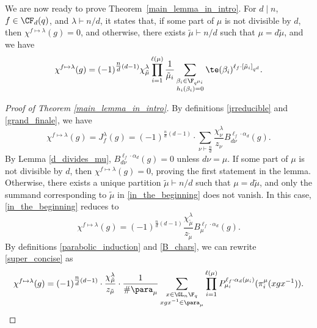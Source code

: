 We are now ready to prove Theorem~\ref{main_lemma_in_intro}.
For \(d \mid n\), \(f \in \CF_d (q)\), and \(\lambda \vdash n/d\), it states that,
if some part of \(\mu\) is not divisible by \(d\), then \(\chi^{f \mapsto \lambda} (g) = 0\), and otherwise, there exists \(\tilde{\mu} \vdash n/d\) such that \(\mu = d \tilde{\mu}\), and we have
\begin{equation}
\chi^{f \mapsto \lambda} (g)
= (-1)^{\tfrac{n}{d}(d-1)}
\chi^\lambda_{\tilde{\mu}}
\prod_{i = 1}^{\ell(\mu)}
\frac{1}{\tilde{\mu}_i}
\sum_{\substack{ \beta_i \in \F_{q^{\mu_i}} \\ h_i(\beta_i) = 0}} \te (\beta_i)^{\ell_f \cdot [\tilde{\mu}_i]_{q^d}}.
\end{equation}



\begin{proof}[Proof of Theorem \ref{main_lemma_in_intro}]
By definitions \eqref{jrreducible} and \eqref{grand_finale}, we have
\begin{equation}
\label{in_the_beginning}
\chi^{f \mapsto \lambda} (g)
= J_f^\lambda (g) = (-1)^{\tfrac{n}{d} (d-1)} \cdot \sum_{\nu \vdash \tfrac{n}{d}} \frac{\chi^\lambda_\nu}{z_\nu} B_{d \nu}^{\ell_f \cdot \alpha_{d}} (g).
\end{equation}
By Lemma \ref{d_divides_mu}, $B_{d \nu}^{\ell_f \cdot \alpha_d} (g) = 0$ unless $d \nu = \mu$.
If some part of $\mu$ is not divisible by $d$, then $\chi^{f \mapsto \lambda}(g) = 0$, proving the first statement in the lemma.
Otherwise, there exists a unique partition \(\tilde{\mu} \vdash n/d\) such that \(\mu = d \tilde{\mu}\),
and only the summand corresponding to \(\tilde{\mu}\) in \eqref{in_the_beginning} does not vanish.
In this case, \eqref{in_the_beginning} reduces to
\begin{equation}
\label{super_concise}
\chi^{f \mapsto \lambda} (g) = (-1)^{\frac{n}{d}(d-1)} \frac{\chi^\lambda_{\tilde{\mu}}}{z_{\tilde{\mu}}} B_{\mu}^{\ell_f \cdot \alpha_d} (g).
\end{equation}
By definitions \eqref{parabolic_induction} and \eqref{B_chars}, we can rewrite \eqref{super_concise} as
\begin{equation}
\label{expandedB_eqn}
\chi^{f \mapsto \lambda} (g)
= (-1)^{\tfrac{n}{d} (d-1)} \cdot \frac{\chi^\lambda_{\tilde{\mu}}}{z_{\tilde{\mu}}} \cdot \frac{1}{\# \para_{\mu}} \sum_{\substack{x \in \GL_n \F_q \\ xgx^{-1} \in \para_{\mu}}} \prod_{i = 1}^{\ell(\mu)} P_{\mu_i}^{\ell_f \cdot \alpha_d (\mu_i)} (\pi^\mu_i (xgx^{-1})).
\end{equation}


\end{proof}
